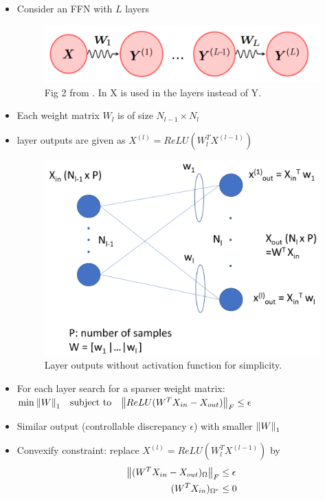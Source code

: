 \begin{itemize}
	\item Consider an FFN with $L$ layers
	\begin{figure}[H]
		\centering
		\includegraphics[width=0.6\linewidth]{./figs/FFN_1.png}  
		\caption{Fig 2 from \textcite{aghasi2017nettrim}. In \textcite{aghasi2020fast} X is used in the layers instead of Y.}
	\end{figure}
	\item Each weight matrix $W_l$ is of size $N_{l-1}\times N_l$
	\item layer outputs are given as $X^{(l)} = ReLU(W_l^TX^{(l-1)})$
	\begin{figure}[H]
		\centering
		\includegraphics[width=.7\linewidth]{./figs/FFN_2.jpg}  
		\caption{Layer outputs without activation function for simplicity.}
	\end{figure}
	\item For each layer search for a sparser weight matrix:\\ $\min_{}\norm{W}_1 \quad \text{subject to} \quad \norm{ReLU(W^T X_{in}-X_{out})}_F \leq \epsilon $
	\item Similar output (controllable discrepancy $\epsilon$) with smaller $\norm{W}_1$
	\item Convexify constraint: replace $X^{(l)} = ReLU(W_l^TX^{(l-1)})$ by \\
	\begin{equation*}
	\begin{aligned}
		\norm{(W^T X_{in}-X_{out})_{\Omega}}_F & \leq \epsilon \\
		(W^T X_{in})_{\Omega^c} & \leq 0
	\end{aligned}

\end{equation*}
\end{itemize}
